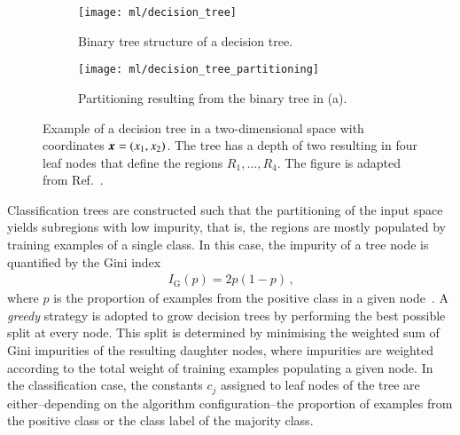 \begin{figure}[htbp]
  \centering

  \begin{subfigure}[b]{0.46\textwidth}
    \centering
    \texttt{[image: ml/decision\_tree]}
    \caption{Binary tree structure of a decision tree.}
  \end{subfigure}\hfill%
  \begin{subfigure}[b]{0.46\textwidth}
    \centering
    \texttt{[image: ml/decision\_tree\_partitioning]}
    \vspace*{0.7em}
    \caption{Partitioning resulting from the binary tree in (a).}
  \end{subfigure}\hfill%

  \caption{Example of a decision tree in a two-dimensional space with
    coordinates $\myvec{x} = (x_1, x_2)$. The tree has a depth of two resulting
    in four leaf nodes that define the regions $R_1, \dots, R_4$. The figure is
    adapted from Ref.~\cite{hastie09}.}%
  \label{fig:decision_tree}
\end{figure}

Classification trees are constructed such that the partitioning of the input
space yields subregions with low impurity, that is, the regions are mostly
populated by training examples of a single class. In this case, the impurity of
a tree node is quantified by the Gini index
\begin{align*}
  I_{\text{G}}(p) = 2 p (1 - p) \,\text{,}
\end{align*}
where $p$ is the proportion of examples from the positive class in a given
node~\cite{hastie09}. A \emph{greedy} strategy is adopted to grow decision trees
by performing the best possible split at every node. This split is determined by
minimising the weighted sum of Gini impurities of the resulting daughter nodes,
where impurities are weighted according to the total weight of training examples
populating a given node. In the classification case, the constants $c_j$
assigned to leaf nodes of the tree are either--depending on the algorithm
configuration--the proportion of examples from the positive class or the class
label of the majority class.

